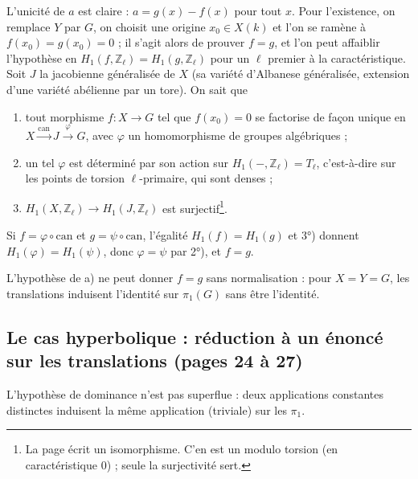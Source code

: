 \documentclass[11pt,a4paper]{article}
\begin{document}
L'unicité de $a$ est claire : $a = g(x) - f(x)$ pour tout $x$. Pour
l'existence, on remplace $Y$ par $G$, on choisit une origine $x_0 \in X(k)$ et
l'on se ramène à $f(x_0) = g(x_0) = 0$ ; il s'agit alors de prouver $f = g$, et
l'on peut affaiblir l'hypothèse en $H_1(f, \mathbb{Z}_\ell) = H_1(g,
\mathbb{Z}_\ell)$ pour un $\ell$ premier à la caractéristique. Soit $J$ la
jacobienne généralisée de $X$ (sa variété d'Albanese généralisée, extension
d'une variété abélienne par un tore). On sait que
\begin{enumerate}
\item[1°)] tout morphisme $f : X \to G$ tel que $f(x_0) = 0$ se factorise de
façon unique en $X \xrightarrow{\mathrm{can}} J \xrightarrow{\varphi} G$, avec
$\varphi$ un homomorphisme de groupes algébriques ;
\item[2°)] un tel $\varphi$ est déterminé par son action sur $H_1(-,
\mathbb{Z}_\ell) = T_\ell$, c'est-à-dire sur les points de torsion
$\ell$-primaire, qui sont denses ;
\item[3°)] $H_1(X, \mathbb{Z}_\ell) \to H_1(J, \mathbb{Z}_\ell)$ est
surjectif\footnote{La page écrit un isomorphisme. C'en est un modulo torsion
(en caractéristique $0$) ; seule la surjectivité sert.}.
\end{enumerate}
Si $f = \varphi \circ \mathrm{can}$ et $g = \psi \circ \mathrm{can}$, l'égalité
$H_1(f) = H_1(g)$ et 3°) donnent $H_1(\varphi) = H_1(\psi)$, donc $\varphi =
\psi$ par 2°), et $f = g$.

L'hypothèse de a) ne peut donner $f = g$ sans normalisation : pour $X = Y = G$,
les translations induisent l'identité sur $\pi_1(G)$ sans être l'identité.

\subsection*{Le cas hyperbolique : réduction à un énoncé sur les translations (pages 24 à 27)}

L'hypothèse de dominance n'est pas superflue : deux applications constantes
distinctes induisent la même application (triviale) sur les $\pi_1$.
\end{document}
